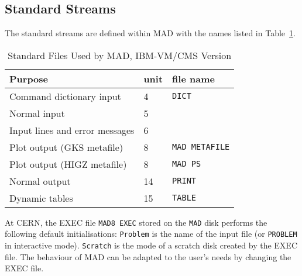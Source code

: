 \subsection{Standard Streams}
The standard streams are defined within MAD with the names listed in
Table~\ref{T-IBM}.
\begin{table}[ht]
\caption{Standard Files Used by MAD, IBM-VM/CMS Version}
\vspace{1ex}
\label{T-IBM}
\centering
\begin{tabular}{|l|l|l|}
\hline
Purpose                         &unit  &file name \\
\hline
Command dictionary input        & 4    &{\tt DICT} \\
Normal input                    & 5    & \\
Input lines and error messages  & 6    & \\
Plot output (GKS metafile)      & 8    &{\tt MAD METAFILE} \\
Plot output (HIGZ metafile)     & 8    &{\tt MAD PS} \\
Normal output                   &14    &{\tt PRINT} \\
Dynamic tables                  &15    &{\tt TABLE} \\
\hline
\end{tabular}
\end{table}
At CERN, the EXEC file {\tt MAD8 EXEC} stored on the {\tt MAD} disk
performs the following default initialisations:
{\tt Problem} is the name of the input file
(or {\tt PROBLEM} in interactive mode).
{\tt Scratch} is the mode of a scratch disk created by the EXEC file.
The behaviour of MAD can be adapted to the user's needs
by changing the EXEC file.

